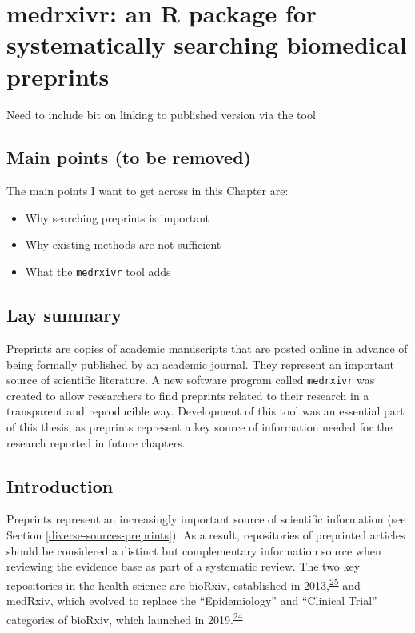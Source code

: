 \documentclass[a4paper, twoside]{templates/ociamthesis}
\begin{document}
\hypertarget{sys-rev-tools-heading}{%
\chapter{medrxivr: an R package for systematically searching biomedical preprints}\label{sys-rev-tools-heading}}

\minitoc 

\colorbox[HTML]{CCCCFF}{Need to include bit on linking to published version via the tool}

\hypertarget{main-points-to-be-removed}{%
\section{Main points (to be removed)}\label{main-points-to-be-removed}}

The main points I want to get across in this Chapter are:

\begin{itemize}
\item
  Why searching preprints is important
\item
  Why existing methods are not sufficient
\item
  What the \texttt{medrxivr} tool adds
\end{itemize}

\hypertarget{lay-summary-1}{%
\section{Lay summary}\label{lay-summary-1}}

Preprints are copies of academic manuscripts that are posted online in advance of being formally published by an academic journal. They represent an important source of scientific literature. A new software program called \texttt{medrxivr} was created to allow researchers to find preprints related to their research in a transparent and reproducible way. Development of this tool was an essential part of this thesis, as preprints represent a key source of information needed for the research reported in future chapters.

\hypertarget{introduction-1}{%
\section{Introduction}\label{introduction-1}}

Preprints represent an increasingly important source of scientific information (see Section \ref{diverse-sources-preprints}). As a result, repositories of preprinted articles should be considered a distinct but complementary information source when reviewing the evidence base as part of a systematic review. The two key repositories in the health science are bioRxiv, established in 2013,\textsuperscript{\protect\hyperlink{ref-sever2019}{25}} and medRxiv, which evolved to replace the ``Epidemiology'' and ``Clinical Trial'' categories of bioRxiv, which launched in 2019.\textsuperscript{\protect\hyperlink{ref-rawlinson2019}{24}}
\end{document}
